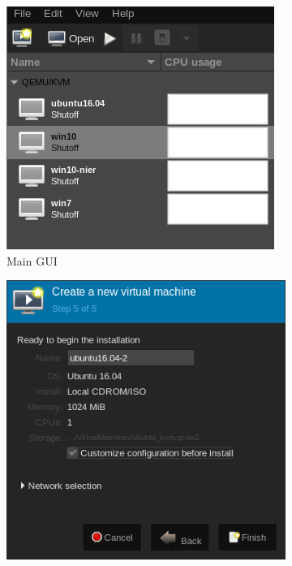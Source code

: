 \documentclass[12pt]{article}
\begin{document}
\begin{figure}[ht]
	\centering
	\begin{subfigure}[t]{0.4\textwidth}
		\includegraphics[width=\textwidth]{kvm_main.png}
		\caption{Main GUI}
	\end{subfigure}
	\begin{subfigure}[t]{0.4\textwidth}
		\includegraphics[width=\textwidth]{kvm_custom.png}

\end{subfigure}
\end{figure}
\end{document}
